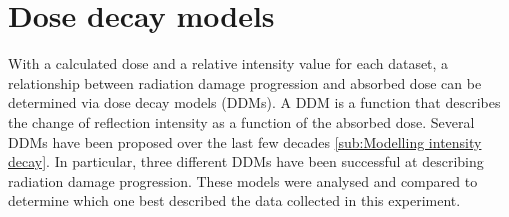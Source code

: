 \section{Dose decay models}
\label{sec:Dose Decay Models}
With a calculated dose and a relative intensity value for each dataset, a relationship between radiation damage progression and absorbed dose can be determined via dose decay models (DDMs).
A DDM is a function that describes the change of reflection intensity as a function of the absorbed dose.
Several DDMs have been proposed over the last few decades \ref{sub:Modelling intensity decay}.
In particular, three different DDMs have been successful at describing radiation damage progression.
These models were analysed and compared to determine which one best described the data collected in this experiment.

